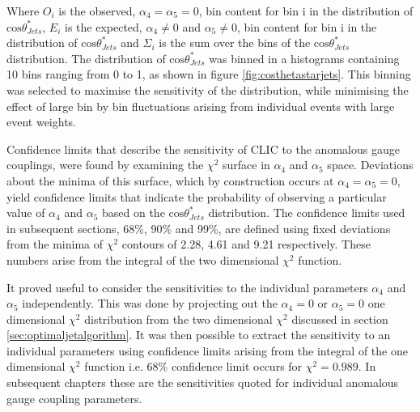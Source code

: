 Where $O_{i}$ is the observed, $\alpha_{4} = \alpha_{5} = 0$, bin content for bin i in the distribution of $\text{cos}\theta^{*}_{Jets}$, $E_{i}$ is the expected, $\alpha_{4} \neq 0$ and $\alpha_{5} \neq 0$, bin content for bin i in the distribution of $\text{cos}\theta^{*}_{Jets}$ and $\Sigma_{i}$ is the sum over the bins of the $\text{cos}\theta^{*}_{Jets}$ distribution.  The distribution of $\text{cos}\theta^{*}_{Jets}$ was binned in a histograms containing 10 bins ranging from 0 to 1, as shown in figure \ref{fig:costhetastarjets}.  This binning was selected to maximise the sensitivity of the distribution, while minimising the effect of large bin by bin fluctuations arising from individual events with large event weights.

Confidence limits that describe the sensitivity of CLIC to the anomalous gauge couplings, were found by examining the $\chi^{2}$ surface in $\alpha_{4}$ and $\alpha_{5}$ space.  Deviations about the minima of this surface, which by construction occurs at $\alpha_{4} = \alpha_{5} = 0$, yield confidence limits that indicate the probability of observing a particular value of $\alpha_{4}$ and $\alpha_{5}$ based on the $\text{cos}\theta^{*}_{Jets}$ distribution.  The confidence limits used in subsequent sections, 68\%, 90\% and 99\%, are defined using fixed deviations from the minima of $\chi^{2}$ contours of 2.28, 4.61 and 9.21 respectively.  These numbers arise from the integral of the two dimensional $\chi^{2}$ function.

It proved useful to consider the sensitivities to the individual parameters $\alpha_{4}$ and $\alpha_{5}$ independently.  This was done by projecting out the $\alpha_{4} = 0$ or $\alpha_{5} = 0$ one dimensional $\chi^{2}$ distribution from the two dimensional $\chi^{2}$ discussed in section \ref{sec:optimaljetalgorithm}.  It was then possible to extract the sensitivity to an individual parameters using confidence limits arising from the integral of the one dimensional $\chi^{2}$ function i.e. 68\% confidence limit occurs for $\chi^{2} = 0.989$.  In subsequent chapters these are the sensitivities quoted for individual anomalous gauge coupling parameters. 


